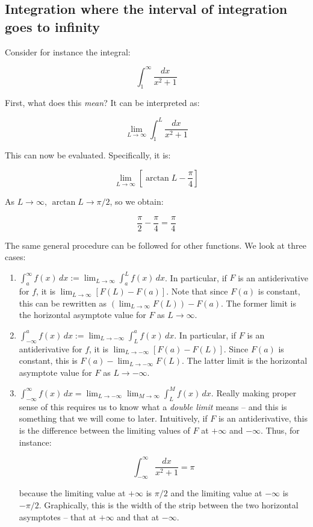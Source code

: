\documentclass[10pt]{amsart}
\begin{document}
\subsection{Integration where the interval of integration goes to infinity}

Consider for instance the integral:

$$\int_1^\infty \frac{dx}{x^2 + 1}$$

First, what does this {\em mean}? It can be interpreted as:

$$\lim_{L \to \infty} \int_1^L \frac{dx}{x^2 + 1}$$

This can now be evaluated. Specifically, it is:

$$\lim_{L \to \infty} [\arctan L - \frac{\pi}{4}]$$

As $L \to \infty$, $\arctan L \to \pi/2$, so we obtain:

$$\frac{\pi}{2} - \frac{\pi}{4} = \frac{\pi}{4}$$

The same general procedure can be followed for other functions. We
look at three cases:

\begin{enumerate}
\item $\int_a^\infty f(x) \, dx := \lim_{L \to \infty} \int_a^L f(x)
  \, dx$. In particular, if $F$ is an antiderivative for $f$, it is
  $\lim_{L \to \infty} [F(L) - F(a)]$. Note that since $F(a)$ is
  constant, this can be rewritten as $(\lim_{L \to \infty} F(L)) -
  F(a)$. The former limit is the horizontal asymptote value for $F$ as
  $L \to \infty$.
\item $\int_{-\infty}^a f(x) \, dx := \lim_{L \to -\infty} \int_L^a
  f(x) \, dx$. In particular, if $F$ is an antiderivative for $f$, it
  is $\lim_{L \to -\infty} [F(a) - F(L)]$. Since $F(a)$ is constant, this
  is $F(a) - \lim_{L \to -\infty} F(L)$. The latter limit is the
  horizontal asymptote value for $F$ as $L \to -\infty$.
\item $\int_{-\infty}^\infty f(x) \, dx = \lim_{L \to -\infty} \lim_{M
  \to \infty} \int_L^M f(x) \, dx$. Really making proper sense of this
  requires us to know what a {\em double limit} means -- and this is
  something that we will come to later. Intuitively, if $F$ is an
  antiderivative, this is the difference between the limiting values
  of $F$ at $+\infty$ and $-\infty$. Thus, for instance:

  $$\int_{-\infty}^\infty \frac{dx}{x^2 + 1} = \pi$$

  because the limiting value at $+\infty$ is $\pi/2$ and the limiting
  value at $-\infty$ is $-\pi/2$. Graphically, this is the width of
  the strip between the two horizontal asymptotes -- that at $+\infty$
  and that at $-\infty$.
\end{enumerate}
\end{document}
